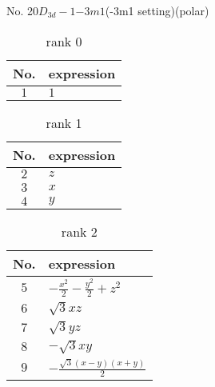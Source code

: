\documentclass[fleqn,8pt,landscape]{jsarticle}
\begin{document}
\setcounter{MaxMatrixCols}{16}

\begin{center}
\LARGE
No. 20\quad$D_{3d}-1$\quad$-3m1$\quad(-3m1 setting)\quad[ trigonal ] (polar)
\end{center}
\begin{table}[ht!]
\begin{center}
\caption{rank 0}
\renewcommand{\arraystretch}{1.3}
\begin{tabular}{cl} \hline \hline
No. & expression \\ \hline
$ 1 $ & $ 1 $ \\
 \hline \hline
\end{tabular}
\end{center}
\end{table}
\begin{table}[ht!]
\begin{center}
\caption{rank 1}
\renewcommand{\arraystretch}{1.3}
\begin{tabular}{cl} \hline \hline
No. & expression \\ \hline
$ 2 $ & $ z $ \\
$ 3 $ & $ x $ \\
$ 4 $ & $ y $ \\
 \hline \hline
\end{tabular}
\end{center}
\end{table}
\begin{table}[ht!]
\begin{center}
\caption{rank 2}
\renewcommand{\arraystretch}{1.3}
\begin{tabular}{cl} \hline \hline
No. & expression \\ \hline
$ 5 $ & $ - \frac{x^{2}}{2} - \frac{y^{2}}{2} + z^{2} $ \\
$ 6 $ & $ \sqrt{3} x z $ \\
$ 7 $ & $ \sqrt{3} y z $ \\
$ 8 $ & $ - \sqrt{3} x y $ \\
$ 9 $ & $ - \frac{\sqrt{3} \left(x - y\right) \left(x + y\right)}{2} $ \\
 \hline \hline
\end{tabular}
\end{center}
\end{table}
\end{document}
